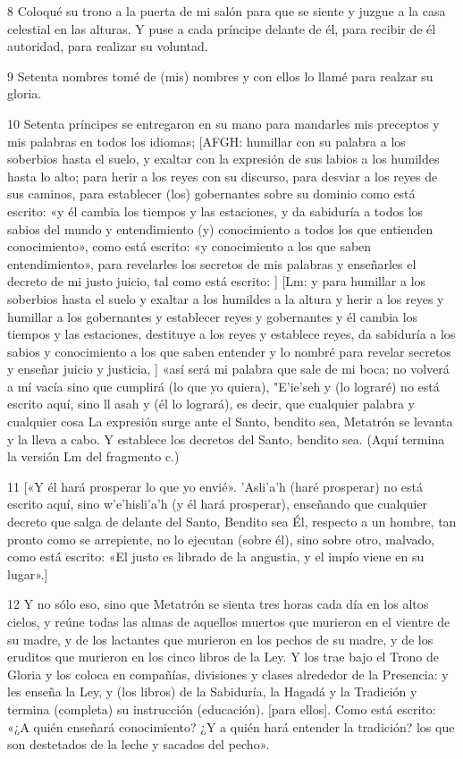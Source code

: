 \par 8 Coloqué su trono a la puerta de mi salón para que se siente y juzgue a la casa celestial en las alturas. Y puse a cada príncipe delante de él, para recibir de él autoridad, para realizar su voluntad.

\par 9 Setenta nombres tomé de (mis) nombres y con ellos lo llamé para realzar su gloria.

\par 10 Setenta príncipes se entregaron en su mano para mandarles mis preceptos y mis palabras en todos los idiomas; [AFGH: humillar con su palabra a los soberbios hasta el suelo, y exaltar con la expresión de sus labios a los humildes hasta lo alto; para herir a los reyes con su discurso, para desviar a los reyes de sus caminos, para establecer (los) gobernantes sobre su dominio como está escrito: «y él cambia los tiempos y las estaciones, y da sabiduría a todos los sabios del mundo y entendimiento (y) conocimiento a todos los que entienden conocimiento», como está escrito: «y conocimiento a los que saben entendimiento», para revelarles los secretos de mis palabras y enseñarles el decreto de mi justo juicio, tal como está escrito: ] [Lm: y para humillar a los soberbios hasta el suelo y exaltar a los humildes a la altura y herir a los reyes y humillar a los gobernantes y establecer reyes y gobernantes y él cambia los tiempos y las estaciones, destituye a los reyes y establece reyes, da sabiduría a los sabios y conocimiento a los que saben entender y lo nombré para revelar secretos y enseñar juicio y justicia, ] «así será mi palabra que sale de mi boca; no volverá a mí vacía sino que cumplirá (lo que yo quiera), "E'ie'seh y (lo lograré) no está escrito aquí, sino ll asah y (él lo logrará), es decir, que cualquier palabra y cualquier cosa La expresión surge ante el Santo, bendito sea, Metatrón se levanta y la lleva a cabo. Y establece los decretos del Santo, bendito sea. (Aquí termina la versión Lm del fragmento c.)

\par 11 [«Y él hará prosperar lo que yo envié». 'Asli'a'h (haré prosperar) no está escrito aquí, sino w'e'hisli'a'h (y él hará prosperar), enseñando que cualquier decreto que salga de delante del Santo, Bendito sea Él, respecto a un hombre, tan pronto como se arrepiente, no lo ejecutan (sobre él), sino sobre otro, malvado, como está escrito: «El justo es librado de la angustia, y el impío viene en su lugar».]

\par 12 Y no sólo eso, sino que Metatrón se sienta tres horas cada día en los altos cielos, y reúne todas las almas de aquellos muertos que murieron en el vientre de su madre, y de los lactantes que murieron en los pechos de su madre, y de los eruditos que murieron en los cinco libros de la Ley. Y los trae bajo el Trono de Gloria y los coloca en compañías, divisiones y clases alrededor de la Presencia: y les enseña la Ley, y (los libros) de la Sabiduría, la Hagadá y la Tradición y termina (completa) su instrucción (educación). [para ellos]. Como está escrito: «¿A quién enseñará conocimiento? ¿Y a quién hará entender la tradición? los que son destetados de la leche y sacados del pecho».


